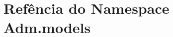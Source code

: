 \hypertarget{namespaceAdm_1_1models}{\section{Refência do Namespace Adm.\-models}
\label{da/d60/namespaceAdm_1_1models}
}
